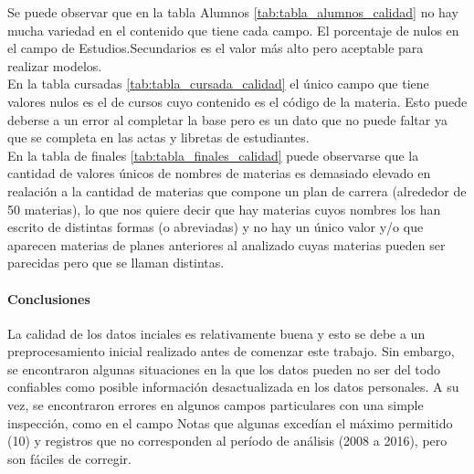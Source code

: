 




Se puede observar que en la tabla Alumnos \ref{tab:tabla_alumnos_calidad} no hay mucha variedad en el contenido que tiene cada campo. El porcentaje de nulos en el campo de Estudios.Secundarios es el valor más alto pero aceptable para realizar modelos.\\

En la tabla cursadas \ref{tab:tabla_cursada_calidad} el único campo que tiene valores nulos es el de cursos cuyo contenido es el código de la materia. Esto puede deberse a un error al completar la base pero es un dato que no puede faltar ya que se completa en las actas y libretas de estudiantes.\\

En la tabla de finales \ref{tab:tabla_finales_calidad} puede observarse que la cantidad de valores únicos de nombres de materias es demasiado elevado en realación a la cantidad de materias que compone un plan de carrera (alrededor de 50 materias), lo que nos quiere decir que hay materias cuyos nombres los han escrito de distintas formas (o abreviadas) y no hay un único valor y/o que aparecen materias de planes anteriores al analizado cuyas materias pueden ser parecidas pero que se llaman distintas.


\paragraph{\textbf{Conclusiones}}
La calidad de los datos inciales es relativamente buena y esto se debe a un preprocesamiento inicial realizado antes de comenzar este trabajo. Sin embargo, se encontraron algunas situaciones en la que los datos pueden no ser del todo confiables como posible información desactualizada en los datos personales. A su vez, se encontraron errores en algunos campos particulares con una simple inspección, como en el campo Notas que algunas excedían el máximo permitido (10) y registros que no corresponden al período de análisis (2008 a 2016), pero son fáciles de corregir.

